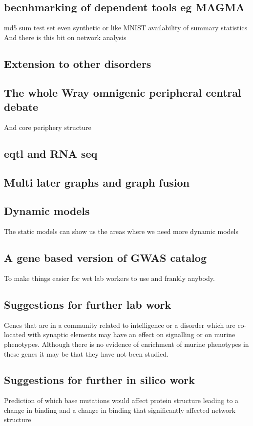 \subsection{becnhmarking of dependent tools eg MAGMA}
md5 sum
\cite{kim2018experimenting}
test set even synthetic or like MNIST
availability of summary statistics
And there is this bit on network analysis\cite{flint2019great}
 \subsection{Extension to other disorders}
 \subsection{The whole Wray omnigenic peripheral central debate}
 And core periphery structure
 \subsection{eqtl and RNA seq}
 \subsection{Multi later graphs and graph fusion}
 \subsection{Dynamic models}
 The static models can show us the areas where we need more dynamic models 
 \subsection{A gene based version of GWAS catalog}
 To make things easier for wet lab workers to use and frankly anybody. 
 \subsection{Suggestions for further lab work}
 Genes that are in a community related to intelligence or a disorder which are co-located with synaptic elements may have an effect on signalling or on murine phenotypes. Although there is no evidence of enrichment of murine phenotypes in these genes it may be that they have not been studied. 
 
 \subsection{Suggestions for further in silico work}
 Prediction of which base mutations would affect protein structure leading to a change in binding and a change in binding that significantly affected network structure
